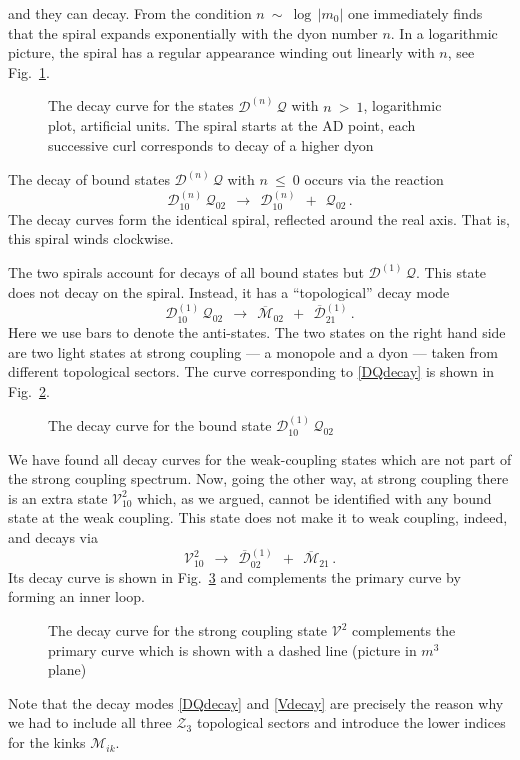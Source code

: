 \documentclass[epsfig,12pt]{article}
\def\beq{\begin{equation}}
\def\eeq{\end{equation}}
\def\beq{\begin{equation}}
\def\eeq{\end{equation}}
\newcommand{\ov}{\overline}
\newcommand{\mc}[1]{\mathcal{#1}}
\newcommand{\M}{\mathcal{M}}
\newcommand{\bM}{\ov{\mathcal{M}}{}}
\newcommand{\Q}{\mathcal{Q}}
\newcommand{\D}{\mathcal{D}}
\newcommand{\V}{\mathcal{V}}
\begin{document}
	and they can decay.
	From the condition $ n ~\sim~ \log\, | m_0 | $ one immediately finds that the spiral expands exponentially 
	with the dyon number $ n $.
	In a logarithmic picture, the spiral has a regular appearance winding out linearly with $ n $, see Fig.~\ref{flinspiral}.
\begin{figure}
\begin{center}
\epsfxsize=7.5cm
\caption{\small The decay curve for the states $ \D^{(n)}\,\Q $ with $ n ~>~ 1 $, logarithmic plot, artificial units. 
		The spiral starts at the AD point,
		each successive curl corresponds to decay of a higher dyon}
\label{flinspiral}
\end{center}
\end{figure}

	The decay of bound states $ \D^{(n)}\,\Q $ with $ n ~\leq~ 0 $ occurs via the reaction
\beq
	\D_{10}^{(n)}\,\Q_{02}  ~~\longrightarrow~~  \D_{10}^{(n)}  ~~+~~  \Q_{02}\,.
\eeq
	The decay curves form the identical spiral, reflected around the real axis.
	That is, this spiral winds clockwise.

	The two spirals account for decays of all bound states but $ \D^{(1)}\,\Q $.
	This state does not decay on the spiral.
	Instead, it has a ``topological'' decay mode
\beq
\label{DQdecay}
	\D_{10}^{(1)}\,\Q_{02}  ~~\longrightarrow~~  \bM_{02}  ~~+~~  \ov{\D}{}_{21}^{(1)}\,.
\eeq
	Here we use bars to denote the anti-states.
	The two states on the right hand side are two light states at strong coupling
	--- a monopole and a dyon --- taken from different topological sectors.
	The curve corresponding to \eqref{DQdecay} is shown in Fig.~\ref{fddecay}.
\begin{figure}
\begin{center}
\epsfxsize=7.5cm
\caption{\small The decay curve for the bound state $ \D_{10}^{(1)}\,\Q_{02} $}
\label{fddecay}
\end{center}
\end{figure}

	We have found all decay curves for the weak-coupling states which are not part of the strong coupling spectrum.
	Now, going the other way, at strong coupling there is an extra state $ \V_{10}^2 $ which, 
	as we argued, cannot be identified with any bound state at the weak coupling.
	This state does not make it to weak coupling, indeed, and decays via
\beq
\label{Vdecay}
	\V_{10}^2  ~~\longrightarrow~~  \ov{\D}{}_{02}^{(1)}  ~~+~~  \bM_{21}\,.
\eeq
	Its decay curve is shown in Fig.~\ref{fvdecay} and complements the primary curve by forming an inner loop.
\begin{figure}
\begin{center}
\epsfxsize=7.5cm
\caption{\small The decay curve for the strong coupling state $ \V^2 $ complements the primary curve
		which is shown with a dashed line (picture in $ m^3 $ plane)}
\label{fvdecay}
\end{center}
\end{figure}
	Note that the decay modes \eqref{DQdecay} and \eqref{Vdecay} are precisely the reason why we had to include all
	three $ \mc{Z}_3 $ topological sectors and introduce the lower indices for the kinks $ \M_{ik} $.
\end{document}
